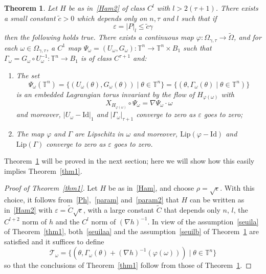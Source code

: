 \documentclass[JEP,XML,SOM,Unicode]{cedram}
\let\mathcal\mathscr
\let\sep\mid
\numberwithin{equation}{section}
\theoremstyle{plain}
\newtheorem{Main}{Theorem}
\theoremstyle{definition}
\newcommand\T{\mathbb T}
\begin{document}
\begin{Main}\label{thm2}
Let $H$ be as in~\eqref{Ham2} of class $C^l$ with $l>2(\tau+1)$. There exists a small constant $\tilde{c}>0$ which depends only on $n,\tau$ and $l$ such that if
\begin{equation}\label{seuilb}
\varepsilon=|P|_l \leq \tilde{c} \gamma
\end{equation}
then the following holds true. There exists a continuous map $\varphi : \Omega_{\gamma,\tau} \to \tilde{\Omega}$, and for each $\omega \in \Omega_{\gamma,\tau}$, a $C^1$ map $\Psi_\omega=(U_\omega,G_\omega) : \T^n \to \T^n \times B_1$ such that $\Gamma_\omega=G_\omega \circ U_\omega^{-1} : \T^n \to B_1$ is of class $C^{\tau+1}$ and:

\begin{enumerate}
\item
The set
\[ \Psi_\omega(\T^n)=\{(U_\omega(\theta),G_\omega(\theta)) \sep \theta \in \T^n\} =\{(\theta,\Gamma_\omega(\theta) \sep \theta \in \T^n)\} \]
is an embedded Lagrangian torus invariant by the flow of $H_{\varphi(\omega)}$ with
\[ X_{H_{\varphi(\omega)}} \circ \Psi_\omega=\nabla \Psi_\omega\cdot \omega \]
and moreover, $|U_\omega-\mathrm{Id}|_1$ and $|\Gamma_\omega|_{\tau+1}$ converge to zero as $\varepsilon$ goes to zero;

\item
The map $\varphi$ and $\Gamma$ are Lipschitz in $\omega$ and moreover, $\mathrm{Lip}(\varphi-\mathrm{Id})$ and $\mathrm{Lip}(\Gamma)$ converge to zero as $\varepsilon$ goes to zero.
\end{enumerate}
\end{Main}

Theorem~\ref{thm2} will be proved in the next section; here we will show how this easily implies Theorem~\ref{thm1}.

\begin{proof}[Proof of Theorem~\ref{thm1}]
Let $H$ be as in~\eqref{Ham}, and choose $\rho=\sqrt{\epsilon}$. With this choice, it follows from~\eqref{Ph},~\eqref{param} and~\eqref{param2} that $H$ can be written as in~\eqref{Ham2} with $\varepsilon=\tilde{C}\sqrt{\epsilon}$, with a large constant $\tilde{C}$ that depends only $n$, $l$, the $C^{l+2}$ norm of $h$ and the $C^{l}$ norm of $(\nabla h)^{-1}$. In view of the assumption~\eqref{seuila} of Theorem~\ref{thm1}, both~\eqref{seuilaa} and the assumption~\eqref{seuilb} of Theorem~\ref{thm2} are satisfied and it suffices to define
\[ \mathcal{T}_\omega=\{(\theta,\Gamma_\omega(\theta)+(\nabla h)^{-1}(\varphi(\omega))) \sep \theta \in \T^n\} \]
so that the conclusions of Theorem~\ref{thm1} follow from those of Theorem~\ref{thm2}.
\end{proof}
\end{document}
